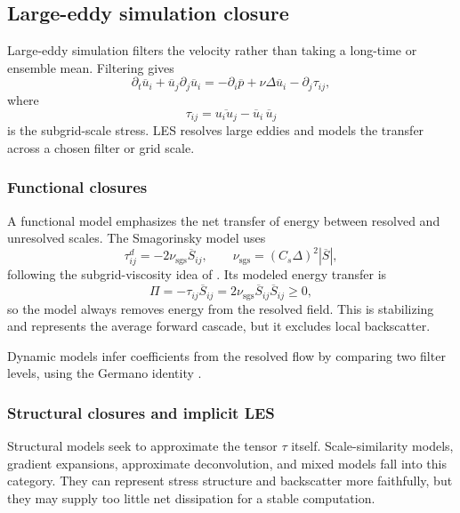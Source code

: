 \documentclass[11pt]{article}
\newcommand{\sgs}{\mathrm{sgs}}
\begin{document}
\subsection{Large-eddy simulation closure}

Large-eddy simulation filters the velocity rather than taking a long-time or ensemble mean. Filtering gives
\begin{equation}
\partial_t\overline u_i
+\overline u_j\partial_j\overline u_i
=-\partial_i\overline p+\nu\Delta\overline u_i-\partial_j\tau_{ij},
\end{equation}
where
\begin{equation}
\tau_{ij}
=\overline{u_i u_j}-\overline u_i\,\overline u_j
\end{equation}
is the subgrid-scale stress. LES resolves large eddies and models the transfer across a chosen filter or grid scale.

\subsubsection{Functional closures}

A functional model emphasizes the net transfer of energy between resolved and unresolved scales. The Smagorinsky model uses
\begin{equation}
\tau_{ij}^{d}
=-2\nu_{\sgs}\overline S_{ij},
\qquad
\nu_{\sgs}=(C_s\Delta)^2|\overline S|,
\end{equation}
following the subgrid-viscosity idea of \citet{smagorinsky1963general}. Its modeled energy transfer is
\begin{equation}
\Pi=-\tau_{ij}\overline S_{ij}
=2\nu_{\sgs}\overline S_{ij}\overline S_{ij}\ge 0,
\end{equation}
so the model always removes energy from the resolved field. This is stabilizing and represents the average forward cascade, but it excludes local backscatter.

Dynamic models infer coefficients from the resolved flow by comparing two filter levels, using the Germano identity \citep{germano1991dynamic}.

\subsubsection{Structural closures and implicit LES}

Structural models seek to approximate the tensor \(\tau\) itself. Scale-similarity models, gradient expansions, approximate deconvolution, and mixed models fall into this category. They can represent stress structure and backscatter more faithfully, but they may supply too little net dissipation for a stable computation.
\end{document}
